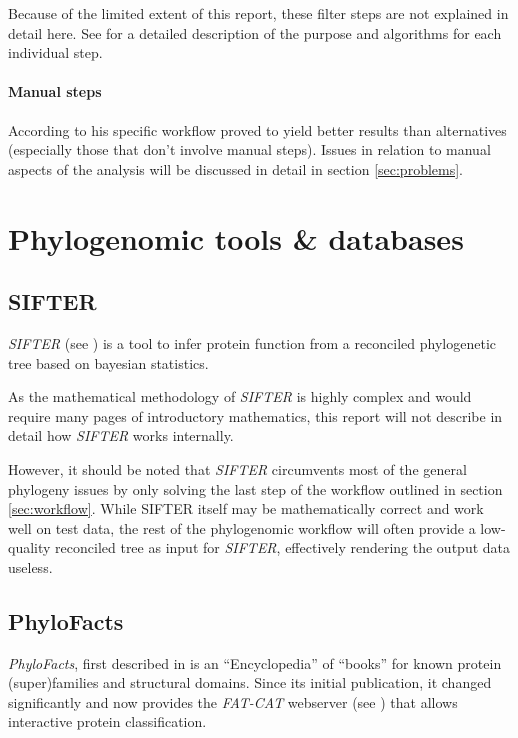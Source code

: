 \documentclass[pdftex,paper=A4,DIV=calc,titlepage,12pt]{scrartcl}
\newtheorem[L]{boxedDefinition}{Definition}
\begin{document}
Because of the limited extent of this report, these filter steps are not explained in detail here. See \cite[p. 3ff]{sjolander2004phylogenomic} for a detailed description of the purpose and algorithms for each individual step.

\paragraph{Manual steps}
According to \cite{sjolander2004phylogenomic} his specific workflow proved to yield better results than alternatives (especially those that don't involve manual steps). Issues in relation to manual aspects of the analysis will be discussed in detail in section \vref{sec:problems}.

\section{Phylogenomic tools \& databases}

\subsection{SIFTER}

\textit{SIFTER} (see \cite{engelhardt2005protein}) is a tool to infer protein function from a reconciled phylogenetic tree based on bayesian statistics.

As the mathematical methodology of \textit{SIFTER} is highly complex and would require many pages of introductory mathematics, this report will not describe in detail how \textit{SIFTER} works internally.

However, it should be noted that \textit{SIFTER} circumvents most of the general phylogeny issues by only solving the last step of the workflow outlined in section \vref{sec:workflow}. While SIFTER itself may be mathematically correct and work well on test data, the rest of the phylogenomic workflow will often provide a low-quality reconciled tree as input for \textit{SIFTER}, effectively rendering the output data useless.

\subsection{PhyloFacts}
\textit{PhyloFacts}, first described in \cite{krishnamurthy2006phylofacts} is an ``Encyclopedia'' of ``books'' for known protein (super)families and structural domains. Since its initial publication, it changed significantly and now provides the \textit{FAT-CAT} webserver (see \cite{afrasiabi2013phylofacts}) that allows interactive protein classification.
\end{document}
